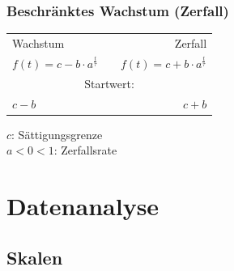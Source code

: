 \begin{multicols}

\subsubsection*{Beschränktes Wachstum (Zerfall)}

\begin{tabular}{lcr}
  Wachstum & & Zerfall\\
$f(t) = c - b\cdot{}a^\frac{t}\tau$ &  & $f(t) = c + b\cdot{}a^\frac{t}\tau$ \\
 \multicolumn{3}{c}{Startwert:}\\
 $c-b$ & & $c+b$
\end{tabular}

$c$: Sättigungsgrenze\\
$a<0<1$: Zerfallsrate



\end{multicols}


\newpage
\section*{Datenanalyse}

\subsection*{Skalen}
\vspace{5mm}


